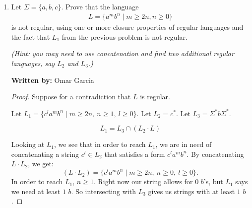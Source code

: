 \documentclass{article}
\theoremstyle{definition}
\newenvironment {solution}
{
\begin{tcolorbox}
}
{
\end{tcolorbox}
}
\begin{document}
\begin{enumerate}
\begin{solution}
              Let $w' = xy^0z \space => w' =xz$.\newline
              By (3), xy contains only $a$'s since $|xy| \leq p$ and that the first $p$ symbols of w are $a$'s. By (2), $y$ contains at least one $a$.\newline
              $\therefore\ w' = xz$ has fewer than $2p$ a's $\And$ still has $p\space b$'s. Hence $w' \notin L_1$, contradicting (1). \newline

              \textbf{Sources:} Went to Office hours. Did not need to use any AI tools to reach this solution.
          \end{solution}




          \pagebreak

    \item  Let $\Sigma = \{a, b, c\}$. Prove that the language
          \begin{align*}
              L = \{a^mb^n \mid m \geq 2n, n \geq 0 \}
          \end{align*}
          is not regular, using one or more closure properties of regular languages and the fact that $L_1$ from the previous problem is not regular.

          \emph{(Hint: you may need to use concatenation and find two additional regular languages, say $L_2$ and $L_3$.)}

          \begin{solution}
              \textbf{Written by:} Omar Garcia

              \medskip
              \begin{proof}
                  Suppose for a contradiction that $L$ is regular.

                  Let $L_1 = \{c^l a^m b^n \mid m \geq 2n,\ n \geq 1,\ l \geq 0\}$.
                  Let $L_2 = c^*$.
                  Let $L_3 = \Sigma^* b \Sigma^*$.

                  $$L_1 = L_3 \cap (L_2 \cdot L)$$

                  Looking at $L_1$, we see that in order to reach $L_1$, we are in need of
                  concatenating a string $c^l \in L_2$ that satisfies a form $c^l a^m b^n$.
                  By concatenating $L \cdot L_2$, we get:
                  $$(L \cdot L_2) = \{c^l a^m b^n \mid m \geq 2n,\ n \geq 0,\ l \geq 0\}.$$
                  In order to reach $L_1$, $n \geq 1$. Right now our string allows for $0$
                  $b$'s, but $L_1$ says we need at least $1$ $b$. So intersecting with $L_3$
                  gives us strings with at least $1$ $b$.


\end{proof}
\end{solution}
\end{enumerate}
\end{document}
